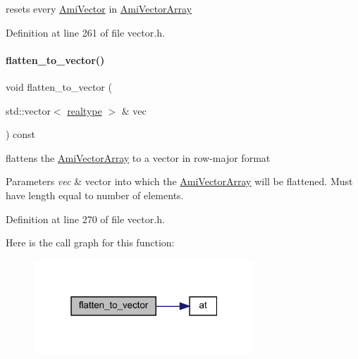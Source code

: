 resets every \mbox{\hyperlink{classamici_1_1_ami_vector}{Ami\+Vector}} in \mbox{\hyperlink{classamici_1_1_ami_vector_array}{Ami\+Vector\+Array}} 

Definition at line 261 of file vector.\+h.

\mbox{\label{classamici_1_1_ami_vector_array_ab084098fb95a107daadc484ee7b5dd76}} 
\paragraph{\texorpdfstring{flatten\_to\_vector()}{flatten\_to\_vector()}}
{\footnotesize\ttfamily void flatten\+\_\+to\+\_\+vector (\begin{DoxyParamCaption}\item[{std\+::vector$<$ \mbox{\hyperlink{namespaceamici_a1bdce28051d6a53868f7ccbf5f2c14a3}{realtype}} $>$ \&}]{vec }\end{DoxyParamCaption}) const}

flattens the \mbox{\hyperlink{classamici_1_1_ami_vector_array}{Ami\+Vector\+Array}} to a vector in row-\/major format 
\begin{DoxyParams}{Parameters}
{\em vec} & vector into which the \mbox{\hyperlink{classamici_1_1_ami_vector_array}{Ami\+Vector\+Array}} will be flattened. Must have length equal to number of elements. \\
\hline
\end{DoxyParams}


Definition at line 270 of file vector.\+h.

Here is the call graph for this function\+:
\nopagebreak
\begin{figure}[H]
\begin{center}
\leavevmode
\includegraphics[width=235pt]{classamici_1_1_ami_vector_array_ab084098fb95a107daadc484ee7b5dd76_cgraph}
\end{center}
\end{figure}
